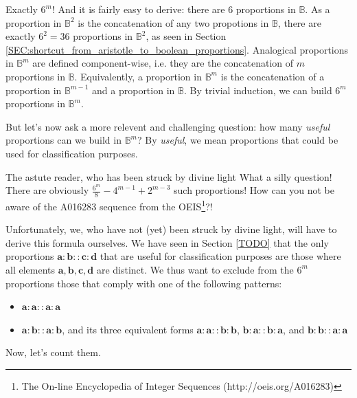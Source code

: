 Exactly $6^m$! And it is fairly easy to derive: there are $6$ proportions in
$\mathbb{B}$. As a proportion in $\mathbb{B}^2$ is the concatenation of any two
propotions in $\mathbb{B}$, there are exactly $6^2 = 36$ proportions in
$\mathbb{B}^2$, as seen in Section
\ref{SEC:shortcut_from_aristotle_to_boolean_proportions}. Analogical
proportions in $\mathbb{B}^m$ are defined component-wise, i.e. they are the
concatenation of $m$ proportions in $\mathbb{B}$. Equivalently, a proportion in
$\mathbb{B}^m$ is the concatenation of a proportion in $\mathbb{B}^{m - 1}$ and
a proportion in $\mathbb{B}$. By trivial induction, we can build $6^m$
proportions in $\mathbb{B}^m$.

But let's now ask a more relevent and challenging question: how many
\textit{useful} proportions can we build in $\mathbb{B}^m$? By \textit{useful},
we mean proportions that could be used for classification purposes.

\begin{aquote}{The astute reader, who has been struck by divine light}
  What a silly question! There are obviously $\frac{6^m}{8} - 4^{m - 1} + 2^{m
  - 3}$ such proportions! How can you not be aware of the A016283 sequence from
  the OEIS\footnote{The On-line Encyclopedia of Integer Sequences
  (http://oeis.org/A016283)}?!
\end{aquote}

Unfortunately, we, who have not (yet) been struck by divine light, will have to
derive this formula ourselves. We have seen in Section \ref{TODO} that the only
proportions $\mathbf{a} : \mathbf{b} :: \mathbf{c} : \mathbf{d}$ that are
useful for classification purposes are those where all elements $\mathbf{a},
\mathbf{b}, \mathbf{c}, \mathbf{d}$ are distinct. We thus want to exclude from
the $6^m$ proportions those that comply with one of the following patterns:

\begin{itemize}
  \item $\mathbf{a}: \mathbf{a} :: \mathbf{a} : \mathbf{a}$
  \item $\mathbf{a}: \mathbf{b} :: \mathbf{a} : \mathbf{b}$, and its three
    equivalent forms $\mathbf{a}: \mathbf{a} :: \mathbf{b} : \mathbf{b}$,
    $\mathbf{b}: \mathbf{a} :: \mathbf{b} : \mathbf{a}$, and $\mathbf{b}:
    \mathbf{b} :: \mathbf{a} : \mathbf{a}$
\end{itemize}

Now, let's count them.

